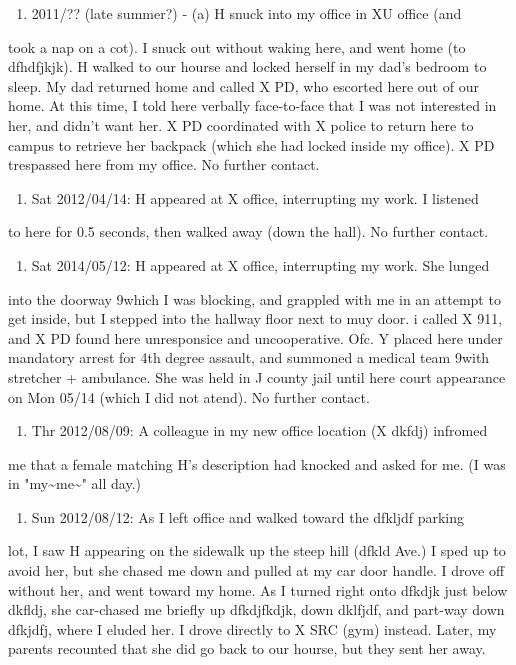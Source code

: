 \documentclass[12pt]{book}
\begin{document}
\begin{enumerate}
\item 2011/?? (late summer?) - (a) H snuck into my office in XU office (and
\end{enumerate}
took a nap on a cot). I snuck out without waking here, and went home (to 
dfhdfjkjk). H walked to our hourse and locked herself in my dad's bedroom to
sleep. My dad returned home and called X PD, who escorted here out of our 
home. At this time, I told here verbally face-to-face that I was not 
interested in her, and didn't want her. X PD coordinated with X police to 
return here to campus to retrieve her backpack (which she had locked inside 
my office). X PD trespassed here from my office. No further contact. 

\begin{enumerate}
\item Sat 2012/04/14: H appeared at X office, interrupting my work. I listened
\end{enumerate}
to here for 0.5 seconds, then walked away (down the hall). No further 
contact.

\begin{enumerate}
\item Sat 2014/05/12: H appeared at X office, interrupting my work. She lunged
\end{enumerate}
into the doorway 9which I was blocking, and grappled with me in an attempt 
to get inside, but I stepped into the hallway floor next to muy door. i 
called X 911, and X PD found here unresponsice and uncooperative. Ofc. Y 
placed here under mandatory arrest for 4th degree assault, and summoned a 
medical team 9with stretcher + ambulance. She was held in J county jail 
until here court appearance on Mon 05/14 (which I did not atend). No further
contact.

\begin{enumerate}
\item Thr 2012/08/09: A colleague in my new office location (X dkfdj) infromed
\end{enumerate}
me that a female matching H's description had knocked and asked for me. (I 
was in "my\textasciitilde{}me\textasciitilde{}" all day.)

\begin{enumerate}
\item Sun 2012/08/12: As I left office and walked toward the dfkljdf parking
\end{enumerate}
lot, I saw H appearing on the sidewalk up the steep hill (dfkld Ave.) I sped
up to avoid her, but she chased me down and pulled at my car door handle. I
drove off without her, and went toward my home. As I turned right onto 
dfkdjk just below dkfldj, she car-chased me briefly up dfkdjfkdjk, down 
dklfjdf, and part-way down dfkjdfj, where I eluded her. I drove directly to 
X SRC (gym) instead. Later, my parents recounted that she did go back to our
hourse, but they sent her away. 
\end{document}
